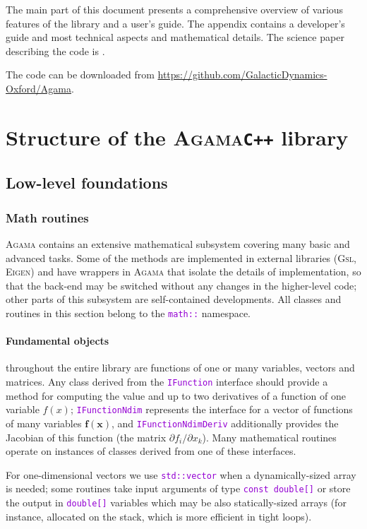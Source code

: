 \documentclass[12pt]{article}
\newcommand{\Agama}{\textsc{Agama}\xspace}
\newcommand{\Gsl}  {\textsc{Gsl}\xspace}
\newcommand{\Eigen}{\textsc{Eigen}\xspace}
\newcommand{\Cpp}  {\texttt{C++}\xspace}
\newcommand{\ttt}[1]{\textcolor{darkviolet}{\texttt{#1}}}
\renewcommand{\d}{\partial}
\newcommand{\bx}{\boldsymbol{x}}
\begin{document}
The main part of this document presents a comprehensive overview of various features of the library and a user's guide. The appendix contains a developer's guide and most technical aspects and mathematical details. The science paper describing the code is \cite{Vasiliev2019}.

The code can be downloaded from \url{https://github.com/GalacticDynamics-Oxford/Agama}.


\section{Structure of the \Agama \Cpp library}  \label{sec:Structure}

\subsection{Low-level foundations}

\subsubsection{Math routines}  \label{sec:Math}
\Agama contains an extensive mathematical subsystem covering many basic and advanced tasks. Some of the methods are implemented in external libraries (\Gsl, \Eigen) and have wrappers in \Agama that isolate the details of implementation, so that the back-end may be switched without any changes in the higher-level code; other parts of this subsystem are self-contained developments.
All classes and routines in this section belong to the \ttt{math::} namespace.

\paragraph{Fundamental objects}
throughout the entire library are functions of one or many variables, vectors and matrices.
Any class derived from the \ttt{IFunction} interface should provide a method for computing the value and up to two derivatives of a function of one variable $f(x)$; \ttt{IFunctionNdim} represents the interface for a vector of functions of many variables $\boldsymbol{f}(\bx)$, and \ttt{IFunctionNdimDeriv} additionally provides the Jacobian of this function (the matrix $\d f_i /\d x_k$). Many mathematical routines operate on instances of classes derived from one of these interfaces.

For one-dimensional vectors we use \ttt{std::vector} when a dynamically-sized array is needed; some routines take input arguments of type \ttt{const double[]} or store the output in \ttt{double[]} variables which may be also statically-sized arrays (for instance, allocated on the stack, which is more efficient in tight loops).
\end{document}
